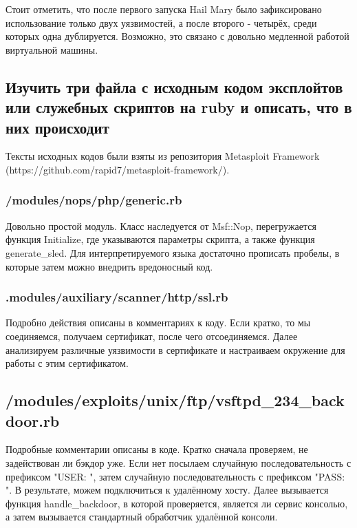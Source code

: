\documentclass[a4paper]{article}
\begin{document}
Стоит отметить, что после первого запуска Hail Mary было зафиксировано использование только двух уязвимостей, а после второго - четырёх, среди которых одна дублируется. Возможно, это связано с довольно медленной работой виртуальной машины.

\subsection{Изучить три файла с исходным кодом эксплойтов или служебных скриптов на ruby и описать, что в них происходит}

Тексты исходных кодов были взяты из репозитория Metasploit Framework (https://github.com/rapid7/metasploit-framework/).

\subsubsection{/modules/nops/php/generic.rb}



Довольно простой модуль. Класс наследуется от Msf::Nop, перегружается функция Initialize, где указываются параметры скрипта, а также функция generate\_sled. Для интерпретируемого языка достаточно прописать пробелы, в которые затем можно внедрить вредоносный код.

\subsubsection{.modules/auxiliary/scanner/http/ssl.rb}



Подробно действия описаны в комментариях к коду. Если кратко, то мы соединяемся, получаем сертификат, после чего отсоединяемся. Далее анализируем различные уязвимости в сертификате и настраиваем окружение для работы с этим сертификатом.

\subsection{/modules/exploits/unix/ftp/vsftpd\_234\_backdoor.rb}



Подробные комментарии описаны в коде. Кратко \- сначала проверяем, не задействован ли бэкдор уже. Если нет \- посылаем случайную последовательность с префиксом "USER: ", затем случайную последовательность с префиксом "PASS: ". В результате, можем подключиться к удалённому хосту. Далее вызывается функция handle\_backdoor, в которой проверяется, является ли сервис консолью, а затем вызывается стандартный обработчик удалённой консоли.
\end{document}
